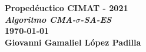 
\textbf{Propedéuctico CIMAT - 2021\\
    \textit{Algoritmo CMA-}}$\bm{\mathit{\sigma}}$\textbf{\textit{-SA-ES}}\\

\textbf{\today}
\\

\textbf{Giovanni Gamaliel López Padilla}\\